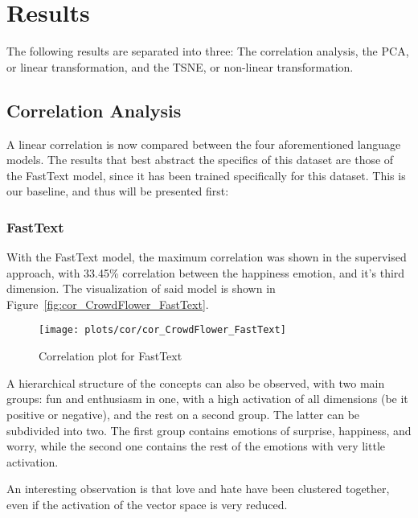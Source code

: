 \section{Results}\label{sec:Results}

The following results are separated into three: The correlation analysis, the PCA, or linear transformation, and the TSNE, or non-linear transformation.

\subsection{Correlation Analysis}\label{sub:Correlation Analysis}
A linear correlation is now compared between the four aforementioned language models. The results that best abstract the specifics of this dataset are those of the FastText model, since it has been trained specifically for this dataset. This is our baseline, and thus will be presented first:


\subsubsection{FastText}
With the FastText model, the maximum correlation was shown in the supervised approach, with 33.45\% correlation between the happiness emotion, and it's third dimension. The visualization of said model is shown in Figure~\ref{fig:cor_CrowdFlower_FastText}.

\begin{figure}[H]
  \texttt{[image: plots/cor/cor\_CrowdFlower\_FastText]}
  \centering
  \caption{Correlation plot for FastText}
\end{figure}\label{fig:cor_CrowdFlower_FastText}

A hierarchical structure of the concepts can also be observed, with two main groups: fun and enthusiasm in one, with a high activation of all dimensions (be it positive or negative), and the rest on a second group. The latter can be subdivided into two. The first group contains emotions of surprise, happiness, and worry, while the second one contains the rest of the emotions with very little activation.

An interesting observation is that love and hate have been clustered together, even if the activation of the vector space is very reduced.

